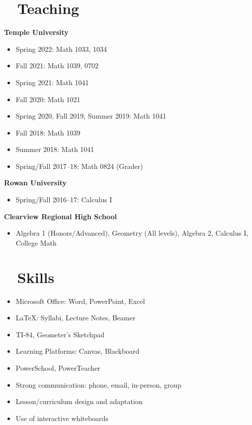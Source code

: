 \documentclass[11pt]{article}
\begin{document}
\section*{\faBookOpen ~ Teaching}
\textbf{Temple University}
\begin{itemize}
    \item Spring 2022: Math 1033, 1034
    \item Fall 2021: Math 1039, 0702
    \item Spring 2021: Math 1041
    \item Fall 2020: Math 1021
    \item Spring 2020, Fall 2019, Summer 2019: Math 1041
    \item Fall 2018: Math 1039
    \item Summer 2018: Math 1041
    \item Spring/Fall 2017--18: Math 0824 (Grader)
\end{itemize}

\textbf{Rowan University}
\begin{itemize}
    \item Spring/Fall 2016--17: Calculus I
\end{itemize}

\textbf{Clearview Regional High School}
\begin{itemize}
    \item Algebra 1 (Honors/Advanced), Geometry (All levels), Algebra 2, Calculus I, College Math
\end{itemize}

\section*{\faTools ~ Skills}
\begin{itemize}
    \item Microsoft Office: Word, PowerPoint, Excel
    \item LaTeX: Syllabi, Lecture Notes, Beamer
    \item TI-84, Geometer's Sketchpad
    \item Learning Platforms: Canvas, Blackboard
    \item PowerSchool, PowerTeacher
    \item Strong communication: phone, email, in-person, group
    \item Lesson/curriculum design and adaptation
    \item Use of interactive whiteboards
\end{itemize}
\end{document}
